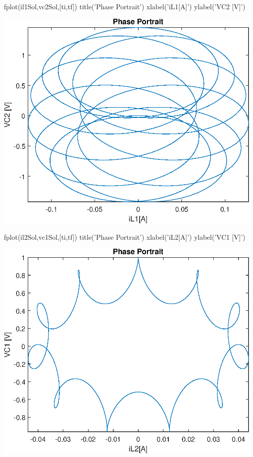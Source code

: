 \documentclass[10pt,a4paper]{article} %
\begin{document}
\begin{matlabcode}
	fplot(il1Sol,vc2Sol,[ti,tf])
	title('Phase Portrait')
	xlabel('iL1[A]')
	ylabel('VC2 [V]')
\end{matlabcode}
\begin{center}
	\includegraphics[width=\maxwidth{56.196688409433015em}]{figure_1_10}
\end{center}


\begin{matlabcode}
	fplot(il2Sol,vc1Sol,[ti,tf])
	title('Phase Portrait')
	xlabel('iL2[A]')
	ylabel('VC1 [V]')
\end{matlabcode}
\begin{center}
	\includegraphics[width=\maxwidth{56.196688409433015em}]{figure_2_10}
\end{center}
\end{document}
